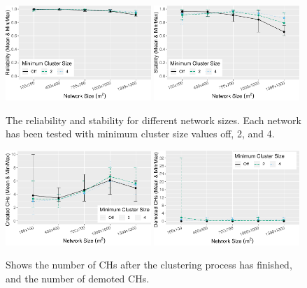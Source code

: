 \begin{figure}[bt]
    \centering
    \includegraphics[width=0.49\textwidth, keepaspectratio]{figure/Results/ParameterEvaluation/MinNodeCount_Reliability.pdf}
    \includegraphics[width=0.49\textwidth, keepaspectratio]{figure/Results/ParameterEvaluation/MinNodeCount_Stability.pdf}
    \caption{The reliability and stability for different network sizes. Each network has been tested with minimum cluster size values off, 2, and 4.}
    \label{fig:min-node-count-reliability}
\end{figure}

\begin{figure}[bt]
    \centering
    \includegraphics[width=0.49\textwidth, keepaspectratio]{figure/Results/ParameterEvaluation/MinNodeCount_CHsAfterDemotion.pdf}
    \includegraphics[width=0.49\textwidth, keepaspectratio]{figure/Results/ParameterEvaluation/MinNodeCount_DemotedCHs.pdf}
    \caption{Shows the number of CHs after the clustering process has finished, and the number of demoted CHs.}
    \label{fig:minnodecount-chsafterdemotion}
\end{figure}

